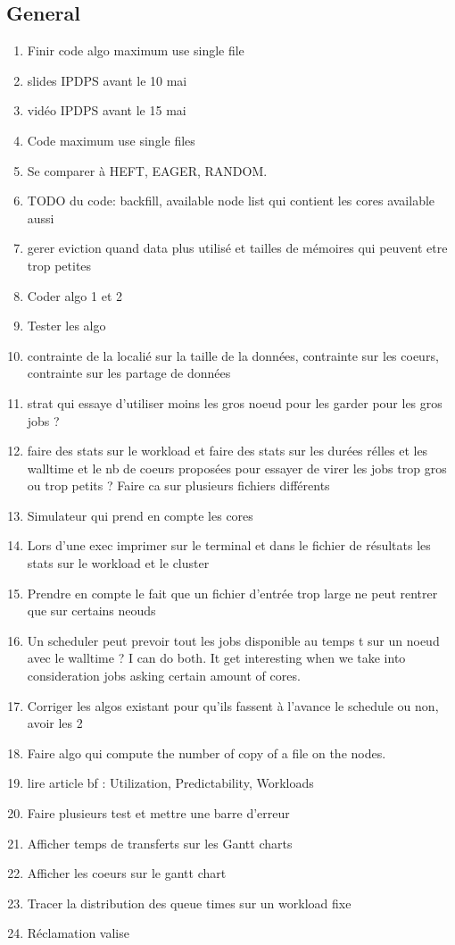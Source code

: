 \documentclass[a4paper]{article}
\begin{document}
	\subsection{General}
		\begin{enumerate}
			\item Finir code algo maximum use single file
			\item slides IPDPS avant le 10 mai
			\item vidéo IPDPS avant le 15 mai
			\item Code maximum use single files
			\item Se comparer à HEFT, EAGER, RANDOM.
			\item TODO du code: backfill, available node list qui contient les cores available aussi
			\item gerer eviction quand data plus utilisé et tailles de mémoires qui peuvent etre trop petites
			\item Coder algo 1 et 2
			\item Tester les algo
			\item contrainte de la localié sur la taille de la données, contrainte sur les coeurs, contrainte sur les partage de données
			\item strat qui essaye d'utiliser moins les gros noeud pour les garder pour les gros jobs ?
			\item faire des stats sur le workload et faire des stats sur les durées rélles et les walltime et le nb de coeurs proposées pour essayer de virer les jobs trop gros ou trop petits ? Faire ca sur plusieurs fichiers différents
			\item Simulateur qui prend en compte les cores
			\item Lors d'une exec imprimer sur le terminal et dans le fichier de résultats les stats sur le workload et le cluster
			\item Prendre en compte le fait que un fichier d'entrée trop large ne peut rentrer que sur certains neouds
			\item Un scheduler peut prevoir tout les jobs disponible au temps t sur un noeud avec le walltime ? I can do both. It get interesting when we take into consideration jobs asking certain amount of cores. 
			\item Corriger les algos existant pour qu'ils fassent à l'avance le schedule ou non, avoir les 2
			\item Faire algo qui compute the number of copy of a file on the nodes.
			\item lire article bf : Utilization, Predictability, Workloads
			\item Faire plusieurs test et mettre une barre d'erreur
			\item Afficher temps de transferts sur les Gantt charts
			\item Afficher les coeurs sur le gantt chart
			\item Tracer la distribution des queue times sur un workload fixe
			\item Réclamation valise
		\end{enumerate}
\end{document}
